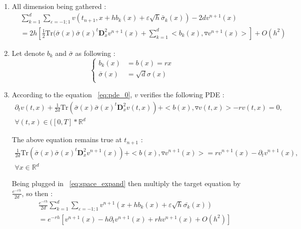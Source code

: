 \documentclass[a4paper,10pt]{article}
\begin{document}
\begin{enumerate}
\item All dimension being gathered :
\begin{equation}\label{eq:space_expand}
\begin{split}
& \sum_{k=1}^d \sum_{\varepsilon={-1;1}}v(t_{n+1},x + hb_k(x) +\varepsilon \sqrt{h}  \bar{\sigma}_k(x))-2dv^{n+1}(x)\\
&=2h[\frac{1}{2}\text{Tr}(\bar{\sigma}(x) \bar{\sigma}(x)^{t} \textbf{D}^2_x v^{n+1}(x) + 
\sum_{k=1}^d <b_k(x) ,\triangledown v^{n+1}(x)>]+
O(h^2)
\end{split}
\end{equation}
\item Let denote $b_k$ and $\bar{\sigma}$ as following :
\begin{equation*}
\left \{ 
 \begin{array}{ll}b_k(x)&=b(x)=rx\\
\bar{\sigma}(x)&=\sqrt{d}\sigma(x)\\ 
\end{array} \right.
\end{equation*}

\item According to the equation ~\eqref{eq:pde_0}, $v$ verifies the following PDE : 
\begin{equation*}
\begin{array}{rcl}
\partial_{t}v(t,x)+\frac{1}{2d}\text{Tr}(\bar{\sigma}(x) \bar{\sigma}(x)^{t} \textbf{D}^2_x v(t,x)) + <b(x) ,\triangledown v(t,x)> - rv(t,x) = 0, \\
\forall (t,x)\in([0,T]*\mathbb{R}^d 
\end{array}
\end{equation*}

The above equation remains true at $t_{n+1}$  :
\begin{equation}\label{eq:chosen_coef}
\begin{array}{rcl}
\frac{1}{2d}\text{Tr}(\bar{\sigma}(x) \bar{\sigma}(x)^{t} \textbf{D}^2_xv^{n+1}(x)) + <b(x),\triangledown v^{n+1}(x)> = rv^{n+1}(x) -\partial_{t}v^{n+1}(x) ,\\
\forall x\in\mathbb{R}^d 
\end{array}
\end{equation}

Being plugged in ~\eqref{eq:space_expand} then multiply the target equation by $\frac{e^{-rh}}{2d}$, so then : 
\begin{equation}
\begin{split}
& \frac{e^{-rh}}{2d}\sum_{k=1}^d \sum_{\varepsilon={-1;1}}v^{n+1}(x + hb_k(x) +\varepsilon \sqrt{h}  \bar{\sigma_k}(x))\\ %
&=e^{-rh}[v^{n+1}(x)-h\partial_{t}v^{n+1}(x)+rhv^{n+1}(x)+O(h^2)]
\end{split}
\end{equation}


\end{enumerate}
\end{document}
